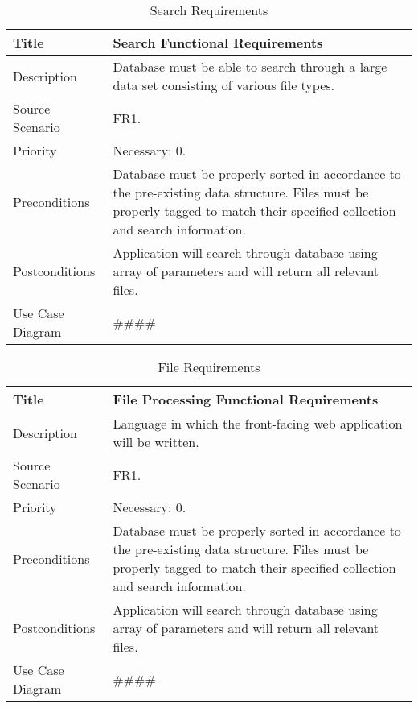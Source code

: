 \label{Search Requirements}
\begin{table}[h!]
  \caption{Search Requirements}
  \label{system-requirements/functional-requirements}
  \begin{tabularx}{\textwidth}{|l|X|}
    \hline
    Title            & Search Functional Requirements \\ \hline
    Description      & Database must be able to search through a large data set consisting of                      various file types. \\ \hline
    Source Scenario  & FR1. \\ \hline
    Priority         & Necessary: 0. \\ \hline
    Preconditions    & Database must be properly sorted in accordance to the 
                       pre-existing data structure. Files must be properly
                       tagged to match their specified collection and search
                       information. \\ \hline
    Postconditions   & Application will search through database using array of
                       parameters and will return all relevant files. \\ \hline
    Use Case Diagram & #### \\ \hline
  \end{tabularx}
\end{table}

\label{File Requirements}
\begin{table}[h!]
  \caption{File Requirements}
  \label{system-requirements/functional-requirements}
  \begin{tabularx}{\textwidth}{|l|X|}
    \hline
    Title            & File Processing Functional Requirements \\ \hline
    Description      & Language in which the front-facing web application 
                       will be written. \\ \hline
    Source Scenario  & FR1. \\ \hline
    Priority         & Necessary: 0. \\ \hline
    Preconditions    & Database must be properly sorted in accordance to the 
                       pre-existing data structure. Files must be properly
                       tagged to match their specified collection and search
                       information. \\ \hline
    Postconditions   & Application will search through database using array of
                       parameters and will return all relevant files. \\ \hline
    Use Case Diagram & #### \\ \hline
  \end{tabularx}
\end{table}